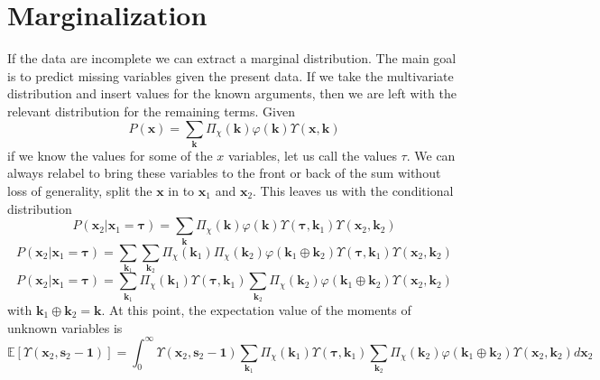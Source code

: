 \documentclass[journal=jcisd8,manuscript=article,layout=onecolumn,pdftex,floatfix,amsmath,amssymb,10pt]{achemso}
\begin{document}
\section{Marginalization}
If the data are incomplete we can extract a marginal distribution. The main goal is to predict missing variables given the present data. If we take the multivariate distribution and insert values for the known arguments, then we are left with the relevant distribution for the remaining terms. Given
\begin{equation}
P(\mathbf{x}) = \sum_{\mathbf{k}} \Pi_\chi(\mathbf{k}) \varphi(\mathbf{k}) \Upsilon(\mathbf{x},\mathbf{k})
\end{equation}
if we know the values for some of the $x$ variables, let us call the values $\tau$. We can always relabel to bring these variables to the front or back of the sum without loss of generality, split the $\mathbf{x}$ in to $\mathbf{x}_1$ and $\mathbf{x}_2$. This leaves us with the conditional distribution 
\begin{equation}
P(\mathbf{x}_2| \mathbf{x}_1 = \boldsymbol\tau)= \sum_{\mathbf{k}} \Pi_\chi(\mathbf{k}) \varphi(\mathbf{k}) \Upsilon(\boldsymbol\tau,\mathbf{k}_1)\Upsilon(\mathbf{x}_2,\mathbf{k}_2)
\end{equation}
\begin{equation}
P(\mathbf{x}_2| \mathbf{x}_1 = \boldsymbol\tau)= \sum_{\mathbf{k}_1}\sum_{\mathbf{k}_2} \Pi_\chi(\mathbf{k}_1)\Pi_\chi(\mathbf{k}_2) \varphi(\mathbf{k}_1 \oplus \mathbf{k}_2) \Upsilon(\boldsymbol\tau,\mathbf{k}_1)\Upsilon(\mathbf{x}_2,\mathbf{k}_2)
\end{equation}
\begin{equation}
P(\mathbf{x}_2| \mathbf{x}_1 = \boldsymbol\tau)= \sum_{\mathbf{k}_1}\Pi_\chi(\mathbf{k}_1)\Upsilon(\boldsymbol\tau,\mathbf{k}_1)\sum_{\mathbf{k}_2} \Pi_\chi(\mathbf{k}_2) \varphi(\mathbf{k}_1 \oplus \mathbf{k}_2) \Upsilon(\mathbf{x}_2,\mathbf{k}_2)
\end{equation}
with $\mathbf{k}_1 \oplus \mathbf{k}_2 = \mathbf{k}$. At this point, the expectation value of the moments of unknown variables is
\begin{equation}
\mathbb{E}[\Upsilon(\mathbf{x}_2,\mathbf{s}_2 - \mathbf{1})] = \int_0^\infty \Upsilon(\mathbf{x}_2,\mathbf{s}_2 - \mathbf{1})\sum_{\mathbf{k}_1}\Pi_\chi(\mathbf{k}_1)\Upsilon(\boldsymbol\tau,\mathbf{k}_1)\sum_{\mathbf{k}_2} \Pi_\chi(\mathbf{k}_2) \varphi(\mathbf{k}_1 \oplus \mathbf{k}_2) \Upsilon(\mathbf{x}_2,\mathbf{k}_2) d\mathbf{x}_2
\end{equation}
\end{document}
